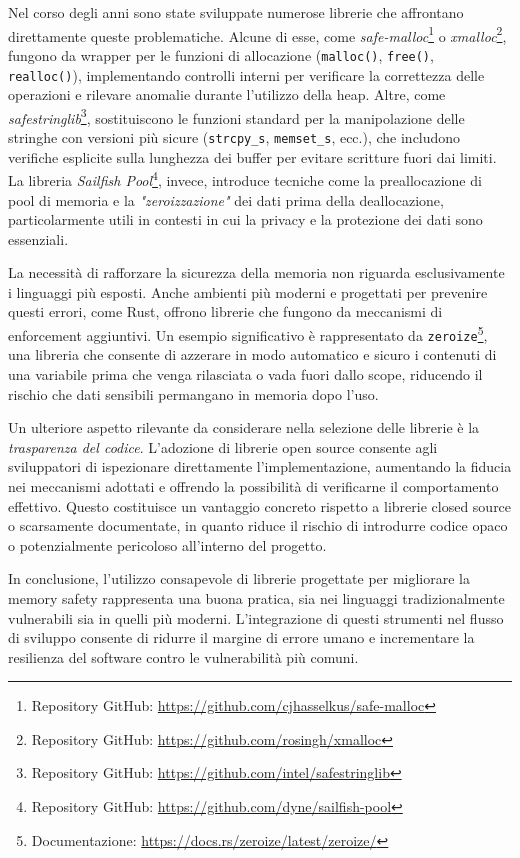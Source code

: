 Nel corso degli anni sono state sviluppate numerose librerie che affrontano direttamente
queste problematiche. Alcune di esse, come \textit{safe-malloc}\protect\footnote{Repository
GitHub: \url{https://github.com/cjhasselkus/safe-malloc}} o \textit{xmalloc}\protect\footnote{Repository
GitHub: \url{https://github.com/rosingh/xmalloc}}, fungono da wrapper per le
funzioni di allocazione (\texttt{malloc()}, \texttt{free()}, \texttt{realloc()}),
implementando controlli interni per verificare la correttezza delle operazioni e
rilevare anomalie durante l'utilizzo della heap. Altre, come \textit{safestringlib}\protect\footnote{Repository
GitHub: \url{https://github.com/intel/safestringlib}}, sostituiscono le funzioni
standard per la manipolazione delle stringhe con versioni più sicure (\texttt{strcpy\_s},
\texttt{memset\_s}, ecc.), che includono verifiche esplicite sulla lunghezza dei
buffer per evitare scritture fuori dai limiti. La libreria \textit{Sailfish Pool}\protect\footnote{Repository
GitHub: \url{https://github.com/dyne/sailfish-pool}}, invece, introduce tecniche
come la preallocazione di pool di memoria e la \textit{"zeroizzazione"} dei dati
prima della deallocazione, particolarmente utili in contesti in cui la privacy e
la protezione dei dati sono essenziali.

La necessità di rafforzare la sicurezza della memoria non riguarda
esclusivamente i linguaggi più esposti. Anche ambienti più moderni e progettati per
prevenire questi errori, come Rust, offrono librerie che fungono da meccanismi di
enforcement aggiuntivi. Un esempio significativo è rappresentato da \texttt{zeroize}\protect\footnote{Documentazione:
\url{https://docs.rs/zeroize/latest/zeroize/}}, una libreria che consente di
azzerare in modo automatico e sicuro i contenuti di una variabile prima che
venga rilasciata o vada fuori dallo scope, riducendo il rischio che dati sensibili
permangano in memoria dopo l'uso.

Un ulteriore aspetto rilevante da considerare nella selezione delle librerie è la
\textit{trasparenza del codice}. L'adozione di librerie open source consente agli
sviluppatori di ispezionare direttamente l'implementazione, aumentando la
fiducia nei meccanismi adottati e offrendo la possibilità di verificarne il
comportamento effettivo. Questo costituisce un vantaggio concreto rispetto a librerie
closed source o scarsamente documentate, in quanto riduce il rischio di
introdurre codice opaco o potenzialmente pericoloso all'interno del progetto.

In conclusione, l'utilizzo consapevole di librerie progettate per migliorare la memory
safety rappresenta una buona pratica, sia nei linguaggi tradizionalmente
vulnerabili sia in quelli più moderni. L'integrazione di questi strumenti nel flusso
di sviluppo consente di ridurre il margine di errore umano e incrementare la resilienza
del software contro le vulnerabilità più comuni.

